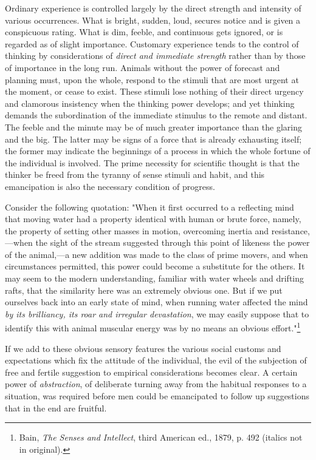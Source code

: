 \documentclass[letterpaper]{book}
\begin{document}
Ordinary experience is controlled largely by the direct strength and
intensity of various occurrences. What is bright, sudden, loud, secures
notice and is given a conspicuous rating. What is dim, feeble, and
continuous gets ignored, or is regarded as of slight importance.
Customary experience tends to the control of thinking by considerations
of \emph{direct and immediate strength} rather than by those of
importance in the long run. Animals without the power of forecast and
planning must, upon the whole, respond to the stimuli that are most
urgent at the moment, or cease to exist. These stimuli lose nothing of
their direct urgency and clamorous insistency when the thinking power
develops; and yet
thinking
demands the subordination of the immediate stimulus to the remote and
distant. The feeble and the minute may be of much greater importance
than the glaring and the big. The latter may be signs of a force that is
already exhausting itself; the former may indicate the beginnings of a
process in which the whole fortune of the individual is involved. The
prime necessity for scientific thought is that the thinker be freed from
the tyranny of sense stimuli and habit, and this emancipation is also
the necessary condition of progress.


Consider the following quotation: "When it first occurred to a
reflecting mind that moving water had a property identical with human or
brute force, namely, the property of setting other masses in motion,
overcoming inertia and resistance,---when the sight of the stream
suggested through this point of likeness the power of the animal,---a
new addition was made to the class of prime movers, and when
circumstances permitted, this power could become a substitute for the
others. It may seem to the modern understanding, familiar with water
wheels and drifting rafts, that the similarity here was an extremely
obvious one. But if we put ourselves back into an early state of mind,
when running water affected the mind \emph{by its brilliancy, its roar
and irregular devastation}, we may easily suppose that to identify this
with animal muscular energy was by no means an obvious
effort."\footnote{
Bain, \emph{The Senses and Intellect}, third American ed., 1879, p. 492
(italics not in original).
}


If we add to these obvious sensory features the various social customs
and expectations which fix the attitude of the individual, the evil of
the subjection of free and fertile suggestion to empirical
considerations
becomes
clear. A certain power of \emph{abstraction}, of deliberate turning away
from the habitual responses to a situation, was required before men
could be emancipated to follow up suggestions that in the end are
fruitful.
\end{document}
